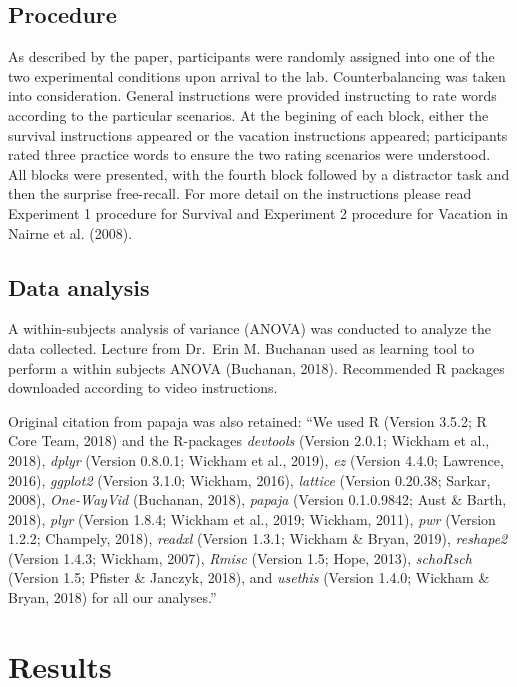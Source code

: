 \documentclass[man]{apa6}
\begin{document}
\hypertarget{procedure}{%
\subsection{Procedure}\label{procedure}}

As described by the paper, participants were randomly assigned into one of the two experimental conditions upon arrival to the lab. Counterbalancing was taken into consideration. General instructions were provided instructing to rate words according to the particular scenarios. At the begining of each block, either the survival instructions appeared or the vacation instructions appeared; participants rated three practice words to ensure the two rating scenarios were understood. All blocks were presented, with the fourth block followed by a distractor task and then the surprise free-recall. For more detail on the instructions please read Experiment 1 procedure for Survival and Experiment 2 procedure for Vacation in Nairne et al. (2008).

\hypertarget{data-analysis}{%
\subsection{Data analysis}\label{data-analysis}}

A within-subjects analysis of variance (ANOVA) was conducted to analyze the data collected. Lecture from Dr.~Erin M. Buchanan used as learning tool to perform a within subjects ANOVA (Buchanan, 2018). Recommended R packages downloaded according to video instructions.

Original citation from papaja was also retained: \enquote{We used R (Version 3.5.2; R Core Team, 2018) and the R-packages \emph{devtools} (Version 2.0.1; Wickham et al., 2018), \emph{dplyr} (Version 0.8.0.1; Wickham et al., 2019), \emph{ez} (Version 4.4.0; Lawrence, 2016), \emph{ggplot2} (Version 3.1.0; Wickham, 2016), \emph{lattice} (Version 0.20.38; Sarkar, 2008), \emph{One-WayVid} (Buchanan, 2018), \emph{papaja} (Version 0.1.0.9842; Aust \& Barth, 2018), \emph{plyr} (Version 1.8.4; Wickham et al., 2019; Wickham, 2011), \emph{pwr} (Version 1.2.2; Champely, 2018), \emph{readxl} (Version 1.3.1; Wickham \& Bryan, 2019), \emph{reshape2} (Version 1.4.3; Wickham, 2007), \emph{Rmisc} (Version 1.5; Hope, 2013), \emph{schoRsch} (Version 1.5; Pfister \& Janczyk, 2018), and \emph{usethis} (Version 1.4.0; Wickham \& Bryan, 2018) for all our analyses.}

\hypertarget{results}{%
\section{Results}\label{results}}
\end{document}

